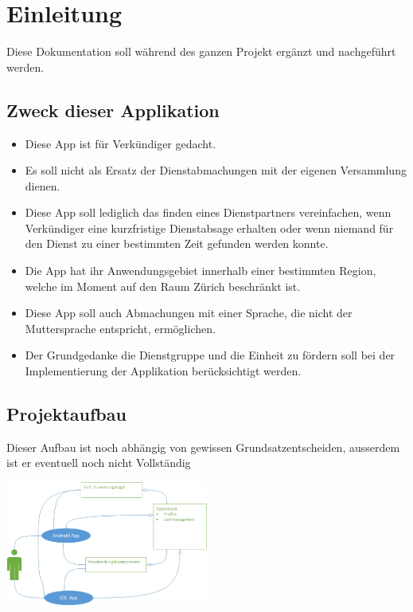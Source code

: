 \chapter{Einleitung}

Diese Dokumentation soll während des ganzen Projekt ergänzt und nachgeführt werden.
\section{Zweck dieser Applikation}
\begin{itemize}
\item Diese App ist für Verkündiger gedacht.
\item Es soll nicht als Ersatz der Dienstabmachungen mit der eigenen Versammlung dienen.
\item Diese App soll lediglich das finden eines Dienstpartners vereinfachen, wenn Verkündiger eine kurzfristige Dienstabsage erhalten oder wenn niemand für den Dienst zu einer bestimmten Zeit gefunden werden konnte.
\item Die App hat ihr Anwendungsgebiet innerhalb einer bestimmten Region, welche im Moment auf den Raum Zürich beschränkt ist.
\item Diese App soll auch Abmachungen mit einer Sprache, die nicht der Muttersprache entspricht, ermöglichen.
\item Der Grundgedanke die Dienstgruppe und die Einheit zu fördern soll bei der Implementierung der Applikation berücksichtigt werden.
\end{itemize}

\section{Projektaufbau}

Dieser Aufbau ist noch abhängig von gewissen Grundsatzentscheiden, ausserdem ist er eventuell noch nicht Vollständig 

\begin{center}
\includegraphics[width=0.5\textwidth]{bilder/useCase.png}
\end{center}
